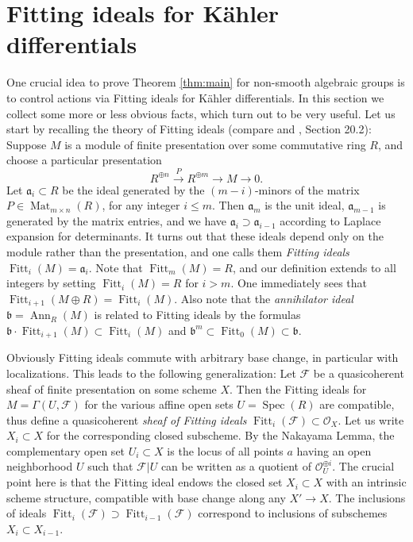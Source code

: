 \documentclass[oneside, 12pt]{amsart}
\theoremstyle{definition}
\theoremstyle{remark}
\newcommand{\ideala}{\mathfrak{a}}
\newcommand{\idealb}{\mathfrak{b}}
\newcommand{\shF}{\mathscr{F}}
\newcommand{\Ann}{\operatorname{Ann}}
\newcommand{\Fitt}{\operatorname{Fitt}}
\newcommand{\lra}{\longrightarrow}
\newcommand{\Mat}{\operatorname{Mat}}
\renewcommand{\O}{\mathscr{O}}
\newcommand{\ra}{\rightarrow}
\newcommand{\Spec}{\operatorname{Spec}}
\begin{document}
\section{Fitting ideals for K\"ahler differentials}
\label{sec:fitting}

One crucial idea to prove Theorem \ref{thm:main} for non-smooth  algebraic groups  is to control actions via
Fitting ideals for K\"ahler differentials.  In this section we collect some more or less obvious facts, which
turn out to be very useful. 
Let us start by recalling the theory of Fitting ideals (compare \cite{Fitting 1936} and \cite{Eisenbud 1995}, Section 20.2): Suppose $M$ is a module of finite presentation
over some commutative ring $R$, and choose a particular presentation
$$
R^{\oplus n}\stackrel{P}{\lra} R^{\oplus m}\lra M\lra 0.
$$
Let  $\ideala_i\subset R$ be the ideal generated by the $(m-i)$-minors of the matrix $P\in\Mat_{m\times n}(R)$, for any integer $i\leq m$.
Then $\ideala_m$ is the unit ideal,  $\ideala_{m-1}$ is generated by the matrix entries, and we have $\ideala_i\supset\ideala_{i-1}$ according to  Laplace expansion
for determinants.  It turns out that these ideals depend only on the module rather than the presentation,
and one calls them \emph{Fitting ideals} $\Fitt_i(M)=\ideala_i$. 
Note that $\Fitt_m(M)=R$, and our definition   extends to all integers   by setting $\Fitt_i(M)=R$ for $i>m$.
One immediately sees that $\Fitt_{i+1}(M\oplus R ) =\Fitt_i(M)$.
Also note that the \emph{annihilator ideal} $\idealb=\Ann_R(M)$ is related to   Fitting ideals by the formulas
$\idealb \cdot \Fitt_{i+1}(M) \subset \Fitt_i(M)$ and 
$\idealb^m \subset\Fitt_0(M) \subset \idealb$.

Obviously Fitting ideals commute with arbitrary base change, 
in particular with localizations. This leads to the following generalization:
Let $\shF$ be a quasicoherent sheaf of finite presentation on some scheme $X$.
Then the Fitting ideals for $M=\Gamma(U,\shF)$ for the various affine open sets $U=\Spec(R)$ are compatible,  
thus define a quasicoherent \emph{sheaf of Fitting ideals} $\Fitt_i(\shF)\subset\O_X$.
Let us write $X_i\subset X$ for the corresponding closed subscheme. 
By the Nakayama Lemma, the  complementary open set $U_i\subset X$ is the locus of all points
$a$ having an open neighborhood $U$ such that 
$\shF|U$ can be written as a  quotient of $\O_U^{\oplus i}$.
The crucial point here is that the Fitting ideal endows the closed set 
$X_i\subset X$ with an intrinsic scheme structure, compatible with base change along any $X' \ra X$.
 The inclusions of ideals $\Fitt_i(\shF)\supset\Fitt_{i-1}(\shF)$ correspond to 
inclusions of subschemes $X_i\subset X_{i-1}$. 
\end{document}
